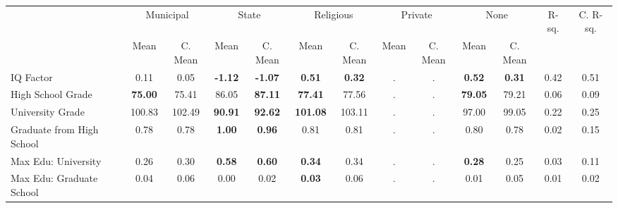 \begin{tabular}{l c c c c c c c c c c c c}
\toprule
& \multicolumn{2}{c}{Municipal} & \multicolumn{2}{c}{State} & \multicolumn{2}{c}{Religious} & \multicolumn{2}{c}{Private} & \multicolumn{2}{c}{None} & R-sq. & C. R-sq. \\
& \scriptsize Mean & \scriptsize C. Mean & \scriptsize Mean & \scriptsize C. Mean & \scriptsize Mean & \scriptsize C. Mean & \scriptsize Mean & \scriptsize C. Mean & \scriptsize Mean & \scriptsize C. Mean & & \\
\midrule
IQ Factor &      0.11 & 0.05 & \textbf{    -1.12} & \textbf{    -1.07} & \textbf{     0.51} & \textbf{     0.32} &         . & . & \textbf{     0.52} & \textbf{     0.31} &      0.42 &      0.51 \\
High School Grade & \textbf{    75.00} & 75.41 &     86.05 & \textbf{    87.11} & \textbf{    77.41} & 77.56 &         . & . & \textbf{    79.05} & 79.21 &      0.06 &      0.09 \\
University Grade &    100.83 & 102.49 & \textbf{    90.91} & \textbf{    92.62} & \textbf{   101.08} & 103.11 &         . & . &     97.00 & 99.05 &      0.22 &      0.25 \\
Graduate from High School &      0.78 & 0.78 & \textbf{     1.00} & \textbf{     0.96} &      0.81 & 0.81 &         . & . &      0.80 & 0.78 &      0.02 &      0.15 \\
Max Edu: University &      0.26 & 0.30 & \textbf{     0.58} & \textbf{     0.60} & \textbf{     0.34} & 0.34 &         . & . & \textbf{     0.28} & 0.25 &      0.03 &      0.11 \\
Max Edu: Graduate School &      0.04 & 0.06 &      0.00 & 0.02 & \textbf{     0.03} & 0.06 &         . & . &      0.01 & 0.05 &      0.01 &      0.02 \\
\bottomrule
\end{tabular}
